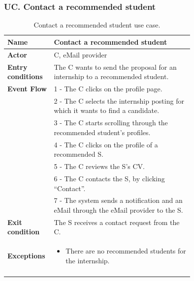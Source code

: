 \subsubsection*{UC\cuc . Contact a recommended student}
\begin{center}
    \begin{longtable}{|l|p{0.75\linewidth}|}
        \hline
        \textbf{Name}               & Contact a recommended student\\
        \hline
        \textbf{Actor}              & C, eMail provider\\
        \hline
        \textbf{Entry conditions}   & The C wants to send the proposal for an internship to a recommended student.\\
        \hline
        \textbf{Event Flow}         & 1 - The C clicks on the profile page. \\
        & 2 - The C selects the internship posting for which it wants to find a candidate. \\
        & 3 - The C starts scrolling through the recommended student’s profiles. \\
        & 4 - The C clicks on the profile of a recommended S. \\
        & 5 - The C reviews the S’s CV. \\
        & 6 - The C contacts the S, by clicking “Contact”. \\
        & 7 - The system sends a notification and an eMail through the eMail provider to the S. \\
        \hline
        \textbf{Exit condition}   & The S receives a contact request from the C. \\       
        \hline
        \textbf{Exceptions}       & \begin{itemize}
            \item There are no recommended students for the internship.
        \end{itemize}\\
        \hline
        \caption{Contact a recommended student use case.}
        \label{tab: contact_recommended_student_use_case}
    \end{longtable}
\end{center}


